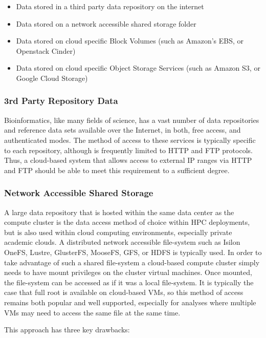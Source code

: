 \begin{itemize}
\item Data stored in a third party data repository on the internet
\item Data stored on a network accessible shared storage folder
\item Data stored on cloud specific Block Volumes (such as Amazon's EBS, or Openstack Cinder)
\item Data stored on cloud specific Object Storage Services\autocite{factor2005object} (such as Amazon S3, or Google Cloud Storage)
\end{itemize}

\subsubsection{3rd Party Repository Data}

Bioinformatics, like many fields of science, has a vast number of data repositories and reference data sets available over the Internet, in both, free access, and authenticated modes. The method of access to these services is typically specific to each repository, although is frequently limited to HTTP and FTP protocols. Thus, a cloud-based system that allows access to external IP ranges via HTTP and FTP should be able to meet this requirement to a sufficient degree.

\subsubsection{Network Accessible Shared Storage}

A large data repository that is hosted within the same data center as the compute cluster is the data access method of choice within HPC deployments, but is also used within cloud computing environments, especially private academic clouds. A distributed network accessible file-system such as Isilon OneFS, Lustre, GlusterFS, MooseFS, GFS, or HDFS is typically used\autocite{sawant2013big}.  In order to take advantage of such a shared file-system a cloud-based compute cluster simply needs to have mount privileges on the cluster virtual machines. Once mounted, the file-system can be accessed as if it was a local file-system. It is typically the case that full root is available on cloud-based VMs, so this method of access remains both popular and well supported, especially for analyses where multiple VMs may need to access the same file at the same time. 

This approach has three key drawbacks:

